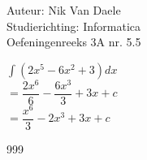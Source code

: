 \documentclass[a4paper]{article}
\newcommand{\bint}{\displaystyle\int}
\begin{document}
  
\noindent \large Auteur: Nik Van Daele \\
\noindent \large Studierichting: Informatica\\
\noindent \large Oefeningenreeks 3A nr. 5.5\\

\medskip

\normalsize

$\bint(2x^5 - 6x^2 +3)dx$\\

$= \dfrac{2x^6}{6} - \dfrac{6x^3}{3} + 3x + c$\\

$= \dfrac{x^6}{3} - 2x^3 + 3x + c$\\

\begin{thebibliography}{999}
\end{thebibliography}
\end{document}
